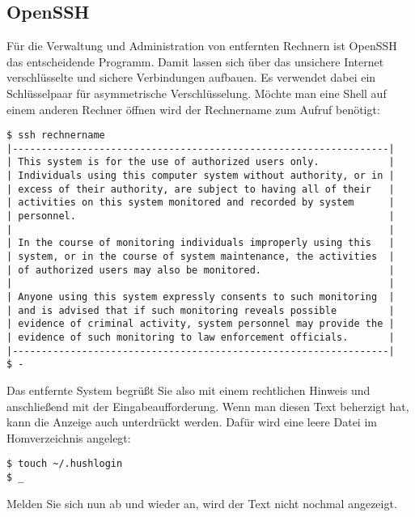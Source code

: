 \documentclass[titlepage,a4paper]{article}
\begin{document}
\subsection{OpenSSH}

Für die Verwaltung und Administration von entfernten Rechnern ist Open\-SSH das entscheidende Programm.
Damit lassen sich über das unsichere Internet verschlüsselte und sichere Verbindungen aufbauen.
Es verwendet dabei ein Schlüsselpaar für asymmetrische Verschlüsselung.
Möchte man eine Shell auf einem anderen Rechner öffnen wird der Rechnername zum Aufruf benötigt:

\begin{samepage}
\begin{verbatim}
$ ssh rechnername
|-----------------------------------------------------------------|
| This system is for the use of authorized users only.            |
| Individuals using this computer system without authority, or in |
| excess of their authority, are subject to having all of their   |
| activities on this system monitored and recorded by system      |
| personnel.                                                      |
|                                                                 |
| In the course of monitoring individuals improperly using this   |
| system, or in the course of system maintenance, the activities  |
| of authorized users may also be monitored.                      |
|                                                                 |
| Anyone using this system expressly consents to such monitoring  |
| and is advised that if such monitoring reveals possible         |
| evidence of criminal activity, system personnel may provide the |
| evidence of such monitoring to law enforcement officials.       |
|-----------------------------------------------------------------|
$ -
\end{verbatim}
\end{samepage}

Das entfernte System begrüßt Sie also mit einem rechtlichen Hinweis
und anschließend mit der Eingabeaufforderung.
Wenn man diesen Text beherzigt hat, kann die Anzeige auch unterdrückt werden.
Dafür wird eine leere Datei im Homverzeichnis angelegt:

\begin{verbatim}
$ touch ~/.hushlogin
$ _  
\end{verbatim}

\noindent
Melden Sie sich nun ab und wieder an, wird der Text nicht nochmal angezeigt.
\end{document}
